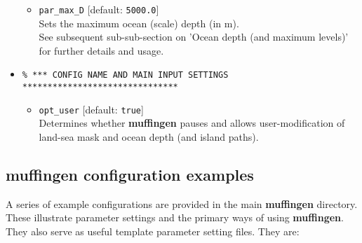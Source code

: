 \documentclass[11pt,fleqn]{book} %
\begin{document}
\begin{itemize}
\begin{itemize}[noitemsep]
\item [] \texttt{par\_max\_D} [default: \texttt{5000.0}]
\\Sets the maximum ocean (scale) depth (in m).
\\ See subsequent sub-sub-section on 'Ocean depth (and maximum levels)' for further details and usage.
\end{itemize}

\vspace{2mm}
\item []
\small\vspace{-2pt}\begin{verbatim}
% *** CONFIG NAME AND MAIN INPUT SETTINGS *******************************
\end{verbatim}\vspace{-2pt}\normalsize

\begin{itemize}[noitemsep]
\vspace{1mm}

\item [] \texttt{opt\_user} [default: \texttt{true}]
\\Determines whether \textbf{muffingen} pauses and allows user-modification of land-sea mask and ocean depth (and island paths).
\end{itemize}

\end{itemize}


\subsection{muffingen configuration examples}

A series of example configurations are provided in the main \textbf{muffingen} directory. These illustrate parameter settings and the primary ways of using \textbf{muffingen}. They also serve as useful template parameter setting files.  They are:
\end{document}
